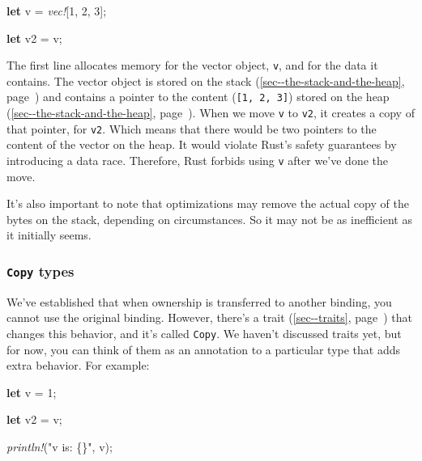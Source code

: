 \documentclass[a4paper,]{book}
\renewcommand*{\hyperref}[2][\ar]{%
  \def\ar{#2}%
  #2 (\autoref{#1}, page~\pageref{#1})}
\newenvironment{Shaded}{\begin{snugshade}}{\end{snugshade}}
\newcommand{\KeywordTok}[1]{\textcolor[rgb]{0.13,0.29,0.53}{\textbf{{#1}}}}
\newcommand{\DecValTok}[1]{\textcolor[rgb]{0.00,0.00,0.81}{{#1}}}
\newcommand{\StringTok}[1]{\textcolor[rgb]{0.31,0.60,0.02}{{#1}}}
\newcommand{\PreprocessorTok}[1]{\textcolor[rgb]{0.56,0.35,0.01}{\textit{{#1}}}}
\newcommand{\NormalTok}[1]{{#1}}
\begin{document}
\begin{Shaded}
\begin{Highlighting}[]
\KeywordTok{let} \NormalTok{v = }\PreprocessorTok{vec!}\NormalTok{[}\DecValTok{1}\NormalTok{, }\DecValTok{2}\NormalTok{, }\DecValTok{3}\NormalTok{];}

\KeywordTok{let} \NormalTok{v2 = v;}
\end{Highlighting}
\end{Shaded}

The first line allocates memory for the vector object, \texttt{v}, and
for the data it contains. The vector object is stored on the
\hyperref[sec--the-stack-and-the-heap]{stack} and contains a pointer to
the content (\texttt{{[}1,\ 2,\ 3{]}}) stored on the
\hyperref[sec--the-stack-and-the-heap]{heap}. When we move \texttt{v} to
\texttt{v2}, it creates a copy of that pointer, for \texttt{v2}. Which
means that there would be two pointers to the content of the vector on
the heap. It would violate Rust's safety guarantees by introducing a
data race. Therefore, Rust forbids using \texttt{v} after we've done the
move.

It's also important to note that optimizations may remove the actual
copy of the bytes on the stack, depending on circumstances. So it may
not be as inefficient as it initially seems.

\subsubsection{\texorpdfstring{\texttt{Copy}
types}{Copy types}}\label{copy-types}

We've established that when ownership is transferred to another binding,
you cannot use the original binding. However, there's a
\hyperref[sec--traits]{trait} that changes this behavior, and it's
called \texttt{Copy}. We haven't discussed traits yet, but for now, you
can think of them as an annotation to a particular type that adds extra
behavior. For example:

\begin{Shaded}
\begin{Highlighting}[]
\KeywordTok{let} \NormalTok{v = }\DecValTok{1}\NormalTok{;}

\KeywordTok{let} \NormalTok{v2 = v;}

\PreprocessorTok{println!}\NormalTok{(}\StringTok{"v is: \{\}"}\NormalTok{, v);}
\end{Highlighting}
\end{Shaded}
\end{document}
